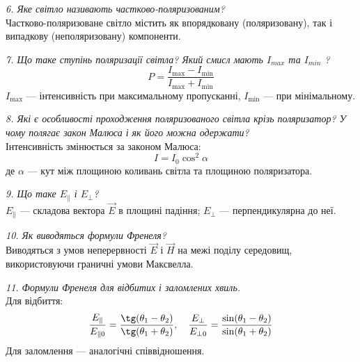\documentclass[12pt,a4paper]{article}
\begin{document}
    \vspace{1em}

    \textit{6. Яке світло називають частково-поляризованим?} \\ 

    Частково-поляризоване світло містить як впорядковану (поляризовану), так і випадкову (неполяризовану) компоненти.

    \vspace{1em}

    \textit{7. Що таке ступінь поляризації світла? Який смисл мають $I_{max}$ та $I_{min}$ ?} \\ 
    \[
    P = \frac{I_{\text{max}} - I_{\text{min}}}{I_{\text{max}} + I_{\text{min}}}
    \]
    $I_{\text{max}}$ — інтенсивність при максимальному пропусканні, $I_{\text{min}}$ — при мінімальному.

    \vspace{1em}

    \textit{8. Які є особливості проходження поляризованого світла крізь поляризатор? У чому полягає закон Малюса і як його можна одержати?} \\ 

    Інтенсивність змінюється за законом Малюса:
    \[
    I = I_0 \cos^2 \alpha
    \]
    де $\alpha$ — кут між площиною коливань світла та площиною поляризатора.

    \vspace{1em}

    \textit{9. Що таке $E_{\parallel}$ і $E_{\perp}$?} \\ 

    $E_{\parallel}$ — складова вектора $\vec{E}$ в площині падіння; $E_{\perp}$ — перпендикулярна до неї.

    \vspace{1em}

    \textit{10. Як виводяться формули Френеля?} \\ 

    Виводяться з умов неперервності $\vec{E}$ і $\vec{H}$ на межі поділу середовищ, використовуючи граничні умови Максвелла.

    \vspace{1em}

    \textit{11. Формули Френеля для відбитих і заломлених хвиль.} \\ 

    Для відбиття:
    \[
    \frac{E_{\parallel}}{E_{\parallel 0}} = \frac{\tg(\theta_1 - \theta_2)}{\tg(\theta_1 + \theta_2)}, \quad \frac{E_{\perp}}{E_{\perp 0}} = \frac{\sin(\theta_1 - \theta_2)}{\sin(\theta_1 + \theta_2)}
    \]
    Для заломлення — аналогічні співвідношення.
\end{document}
